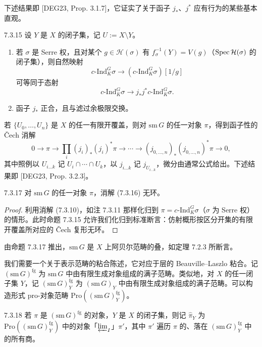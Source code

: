 下述结果即 [DEG23, Prop. 3.1.7]，它证实了关于函子 $j_*$、$j^*$ 应有行为的某些基本直观。

\begin{prop}{7.3.15}\label{thm:a4-7-3-15}
设 $Y$ 是 $X$ 的闭子集，记 $U:=X\setminus Y$。
\begin{enumerate}[label=(\arabic*),leftmargin=2.4em,itemsep=0.15em]
\item 若 $\sigma$ 是 Serre 权，且对某个 $g\in\mathcal H(\sigma)$ 有 $f_\sigma^{-1}(Y)=V(g)$（$\operatorname{Spec}\mathcal H(\sigma)$ 的闭子集），则自然映射
\[
c\text{-Ind}_K^G\sigma\to(c\text{-Ind}_K^G\sigma)[1/g]
\]
可等同于态射
\[
c\text{-Ind}_K^G\sigma\to j_*j^*c\text{-Ind}_K^G\sigma.
\]
\item 函子 $j_*$ 正合，且与滤过余极限交换。
\end{enumerate}
\end{prop}

若 $\{U_0,\dots,U_n\}$ 是 $X$ 的任一有限开覆盖，则对 $\mathrm{sm}\,G$ 的任一对象 $\pi$，得到函子性的 Čech 消解
\begin{equation}\tag{7.3.16}\label{eq:a4-7-3-16}
0\to\pi\to\prod_i(j_i)_*(j_i)^*\pi\to\cdots\to(j_{0,\dots,n})_*(j_{0,\dots,n})^*\pi\to0,
\end{equation}
其中照例以 $U_{i\dots k}$ 记 $U_i\cap\cdots\cap U_k$，以 $j_{i\dots k}$ 记 $j_{U_{i\dots k}}$，微分由通常公式给出。下述结果即 [DEG23, Prop. 3.2.3]。

\begin{prop}{7.3.17}\label{thm:a4-7-3-17}
对 $\mathrm{sm}\,G$ 的任一对象 $\pi$，消解 (7.3.16) 无环。
\end{prop}

\begin{proof}
利用消解 (7.3.10)，如注 7.3.11 那样化归到 $\pi=c\text{-Ind}_K^G\sigma$（$\sigma$ 为 Serre 权）的情形。此时命题 7.3.15 允许我们化归到标准断言：仿射概形按区分开集的有限开覆盖所对应的 Čech 复形无环。
\end{proof}

由命题 7.3.17 推出，$\mathrm{sm}\,G$ 是 $X$ 上阿贝尔范畴的叠，如定理 7.2.3 所断言。

我们需要一个关于表示范畴的粘合陈述，它对应于层的 Beauville--Laszlo 粘合。记 $(\mathrm{sm}\,G)^{\mathrm{fg}}$ 为 $\mathrm{sm}\,G$ 中由有限生成对象组成的满子范畴。类似地，对 $X$ 的任一闭子集 $Y$，记 $(\mathrm{sm}\,G)^{\mathrm{fg}}_Y$ 为 $(\mathrm{sm}\,G)_Y$ 中由有限生成对象组成的满子范畴。可以构造形式 pro-对象范畴 $\mathrm{Pro}((\mathrm{sm}\,G)^{\mathrm{fg}}_Y)$。

\begin{defn}{7.3.18}\label{thm:a4-7-3-18}
若 $\pi$ 是 $(\mathrm{sm}\,G)^{\mathrm{fg}}$ 的对象，$Y$ 是 $X$ 的闭子集，则记 $\hat\pi_Y$ 为 $\mathrm{Pro}((\mathrm{sm}\,G)^{\mathrm{fg}}_Y)$ 中的对象「$\varprojlim_I$」$\pi'$，其中 $\pi'$ 遍历 $\pi$ 的、落在 $(\mathrm{sm}\,G)^{\mathrm{fg}}_Y$ 中的所有商。
\end{defn}

